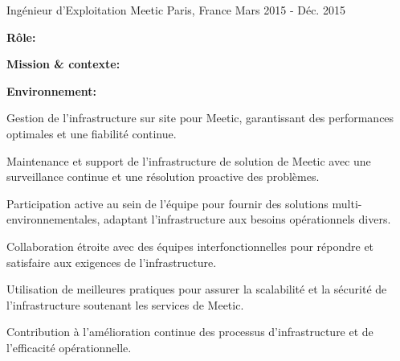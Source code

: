 \begin{cventries}
\cventry
{Ingénieur d'Exploitation} %
{Meetic} %
{Paris, France} %
{Mars 2015 - Déc. 2015} %
{
  \begin{cvitems} %
    \item {\textbf{Rôle:} }
    \item {\textbf{Mission \& contexte:} }
    \item {\textbf{Environnement:} }
    \item {Gestion de l'infrastructure sur site pour Meetic, garantissant des performances optimales et une fiabilité continue.}
    \item {Maintenance et support de l'infrastructure de solution de Meetic avec une surveillance continue et une résolution proactive des problèmes.}
    \item {Participation active au sein de l'équipe pour fournir des solutions multi-environnementales, adaptant l'infrastructure aux besoins opérationnels divers.}
    \item {Collaboration étroite avec des équipes interfonctionnelles pour répondre et satisfaire aux exigences de l'infrastructure.}
    \item {Utilisation de meilleures pratiques pour assurer la scalabilité et la sécurité de l'infrastructure soutenant les services de Meetic.}
    \item {Contribution à l'amélioration continue des processus d'infrastructure et de l'efficacité opérationnelle.}
  \end{cvitems}
}

\end{cventries}
